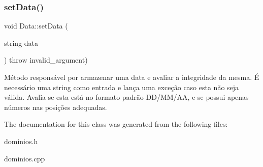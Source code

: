 \subsubsection{\texorpdfstring{set\+Data()}{setData()}}
{\footnotesize\ttfamily void Data\+::set\+Data (\begin{DoxyParamCaption}\item[{string}]{data }\end{DoxyParamCaption}) throw  invalid\+\_\+argument) }

Método responsável por armazenar uma data e avaliar a integridade da mesma. É necessário uma string como entrada e lança uma exceção caso esta não seja válida. Avalia se esta está no formato padrão D\+D/\+M\+M/\+AA, e se possui apenas números nas posições adequadas. 

The documentation for this class was generated from the following files\+:\begin{DoxyCompactItemize}
\item 
dominios.\+h\item 
dominios.\+cpp\end{DoxyCompactItemize}
